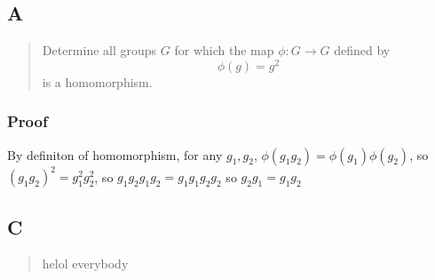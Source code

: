\documentclass[11pt]{article}
\begin{document}
\subsection{A}
\label{sec:org8c77208}

\begin{quote}
Determine all groups \(G\) for which the map \(\phi : G \rightarrow G\) defined by
\begin{equation}
\label{eq:1}
\phi(g) = g^{2}
\end{equation}
is a homomorphism.
\end{quote}
\subsubsection{Proof}
\label{sec:org5568c0b}
By definiton of homomorphism, for any \(g_1, g_2\), \(\phi(g_1 g_2) =
\phi(g_{1}) \phi(g_{2})\), so \((g_1 g_{2})^{2}  =
g_{1}^{2} g_{2}^{2}\), so \(g_1 g_2 g_1 g_2 = g_1 g_1 g_2 g_2\) so \(g_2 g_1 =
g_1 g_2\)
\subsection{C}
\label{sec:org7734908}


\begin{quote}
helol everybody
\end{quote}
\end{document}
